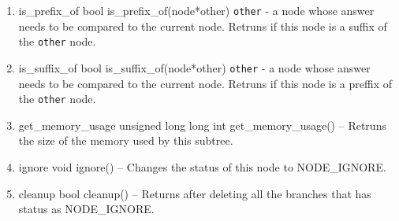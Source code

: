 \begin{enumerate}
\begin{detail}
\end{detail}
\item \begin{detail}
{is\_prefix\_of}
{bool is\_prefix\_of(node*other)}
{\texttt{other} - a node whose answer needs to be compared to the current node.}
{Retruns \true if this node is a suffix of the \texttt{other} node. } 
\end{detail}
\item \begin{detail}
{is\_suffix\_of}
{bool is\_suffix\_of(node*other)}
{\texttt{other} - a node whose answer needs to be compared to the current node.}
{Retruns \true if this node is a preffix of the \texttt{other} node. } 
\end{detail}
\item \begin{detail}
{get\_memory\_usage}
{unsigned long long int get\_memory\_usage()}
{--}
{Retruns the size of the memory used by this subtree. } 
\end{detail}
\item \begin{detail}
{ignore}
{void ignore()}
{--}
{Changes the status of this node to NODE\_IGNORE. } 
\end{detail}
\item \begin{detail}
{cleanup}
{bool cleanup()}
{--}
{Returns \true after deleting all the branches that has status as NODE\_IGNORE. } 
\end{detail}
\end{enumerate}

